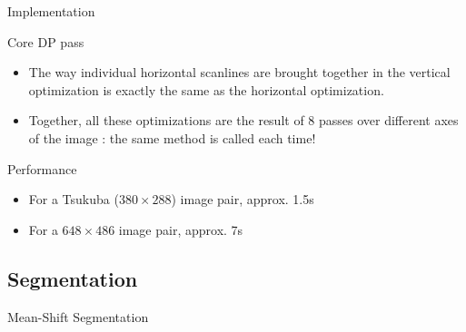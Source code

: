 \documentclass[12pt]{beamer}
\begin{document}
\begin{frame}{Implementation}
  \begin{block}{Core DP pass}
    \begin{itemize}
      \item The way individual horizontal scanlines are brought together in the vertical optimization is exactly the same as the horizontal optimization.
      \item Together, all these optimizations are the result of 8 passes over different axes of the image : the same method is called each time!
    \end{itemize}
  \end{block}

  \begin{block}{Performance}
    \begin{itemize}
      \item For a Tsukuba ($380 \times 288$) image pair, approx. 1.5s
      \item For a $648 \times 486$ image pair, approx. 7s
    \end{itemize}
  \end{block}
\end{frame}

\subsection{Segmentation}

\begin{frame}{Mean-Shift Segmentation}

\end{frame}
\end{document}
